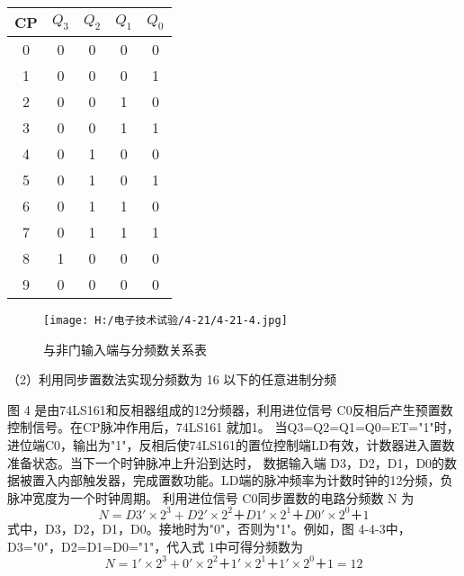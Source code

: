 \documentclass{article}
\begin{document}
            \begin{table}[h]
                \centering  
                \begin{tabular}{c|c|c|c|c}
                    \hline
                          CP             & $Q_3$  &$Q_2$  &$Q_1$  &$Q_0$  \\ \hline
                          0              & 0      &0      & 0     & 0     \\ \hline
                          1              & 0      &0      & 0     & 1            \\ \hline
                          2              & 0      &0      & 1     & 0            \\ \hline
                          3              & 0      &0      & 1     & 1            \\ \hline
                          4              & 0      &1      & 0     & 0            \\ \hline
                          5              & 0      &1      & 0     & 1           \\ \hline
                          6              & 0      &1      & 1     & 0           \\ \hline
                          7              & 0      &1      & 1     & 1           \\ \hline
                          8              & 1      &0      & 0     & 0           \\ \hline
                          9              & 0      &0      & 0     & 0           \\ \hline
                        \end{tabular}
              \end{table}
  \begin{figure}[h]
    \centering
    \texttt{[image: H:/电子技术试验/4-21/4-21-4.jpg]}
    \caption{与非门输入端与分频数关系表} \label{fig:aa}
    \end{figure}
\par

    （2）利用同步置数法实现分频数为 16 以下的任意进制分频\par
    图 4 是由74LS161和反相器组成的12分频器，利用进位信号 C0反相后产生预置数控制信号。在CP脉冲作用后，74LS161 就加1。
    当Q3=Q2=Q1=Q0=ET="1"时，进位端C0，输出为"1"，反相后使74LS161的置位控制端LD有效，计数器进入置数准备状态。当下一个时钟脉冲上升沿到达时，
    数据输入端 D3，D2，D1，D0的数据被置入内部触发器，完成置数功能。LD端的脉冲频率为计数时钟的12分频，负脉冲宽度为一个时钟周期。
    利用进位信号 C0同步置数的电路分频数 N 为
  \[  N=D3'×2^3+D2'×2^2＋D1'×2^1＋D0'×2^0＋1 \]
    式中，D3，D2，D1，D0。接地时为"0"，否则为"1"。例如，图 4-4-3中，D3="0"，D2=D1=D0="1"，代入式 1中可得分频数为
    \[  N=1'×2^3+0'×2^2＋1'×2^1＋1'×2^0＋1=12 \]
\end{document}

